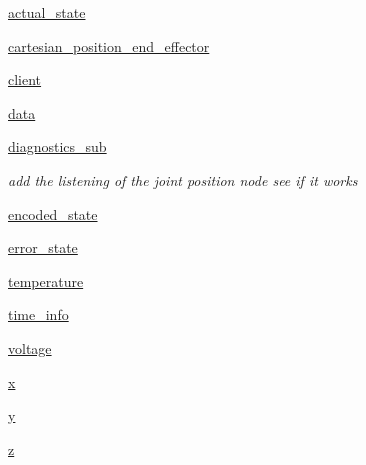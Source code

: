 \begin{DoxyCompactItemize}
\item 
\hyperlink{classButton__Masher__Application__Output_1_1Button__Masher__Application__node__listener_a4141d2c72ff71283722dda8c431a48d6}{actual\+\_\+state}
\item 
\hyperlink{classButton__Masher__Application__Output_1_1Button__Masher__Application__node__listener_ad3dcada5e11b20f5dc822acf601a645b}{cartesian\+\_\+position\+\_\+end\+\_\+effector}
\item 
\hyperlink{classButton__Masher__Application__Output_1_1Button__Masher__Application__node__listener_ad5bc32b75da65fe60067f501a4bb6665}{client}
\item 
\hyperlink{classButton__Masher__Application__Output_1_1Button__Masher__Application__node__listener_a511ae0b1c13f95e5f08f1a0dd3da3d93}{data}
\item 
\hyperlink{classButton__Masher__Application__Output_1_1Button__Masher__Application__node__listener_a547b75f681b266f91f9cc485c2f3b714}{diagnostics\+\_\+sub}
\begin{DoxyCompactList}\small\item\em add the listening of the joint position node see if it works \end{DoxyCompactList}\item 
\hyperlink{classButton__Masher__Application__Output_1_1Button__Masher__Application__node__listener_a4e790a9b608d07d8c1273ce749657a55}{encoded\+\_\+state}
\item 
\hyperlink{classButton__Masher__Application__Output_1_1Button__Masher__Application__node__listener_a954c5caf30928503ff36b24cc6d6414d}{error\+\_\+state}
\item 
\hyperlink{classButton__Masher__Application__Output_1_1Button__Masher__Application__node__listener_ab67dc6cccbf6aeaeeeef8690bacd403c}{temperature}
\item 
\hyperlink{classButton__Masher__Application__Output_1_1Button__Masher__Application__node__listener_aca0b5e2418a650b09d5b7b497bbeecfc}{time\+\_\+info}
\item 
\hyperlink{classButton__Masher__Application__Output_1_1Button__Masher__Application__node__listener_aa1a8261d8fb901476651f1666f993d4b}{voltage}
\item 
\hyperlink{classButton__Masher__Application__Output_1_1Button__Masher__Application__node__listener_a9336ebf25087d91c818ee6e9ec29f8c1}{x}
\item 
\hyperlink{classButton__Masher__Application__Output_1_1Button__Masher__Application__node__listener_a2fb1c5cf58867b5bbc9a1b145a86f3a0}{y}
\item 
\hyperlink{classButton__Masher__Application__Output_1_1Button__Masher__Application__node__listener_a25ed1bcb423b0b7200f485fc5ff71c8e}{z}
\end{DoxyCompactItemize}


